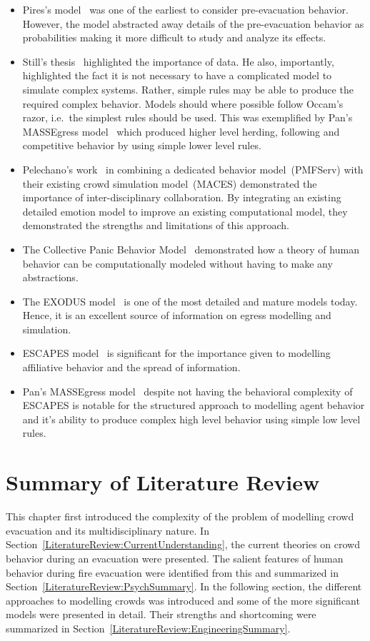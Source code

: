 \begin{itemize}
	\item Pires's model~\cite{Pires:2005gs} was one of the earliest to consider pre-evacuation behavior. However, the model abstracted away details of the pre-evacuation behavior as probabilities making it more difficult to study and analyze its effects.
	\item Still's thesis~\cite{Still:2000tp} highlighted the importance of data. He also, importantly, highlighted the fact it is not necessary to have a complicated model to simulate complex systems. Rather, simple rules may be able to produce the required complex behavior. Models should where possible follow Occam's razor, i.e.\ the simplest rules should be used. This was exemplified by Pan's MASSEgress model~\cite{Pan:2007gb} which produced higher level herding, following and competitive behavior by using simple lower level rules.
	\item Pelechano's work~\cite{Pelechano:2005vp} in combining a dedicated behavior model~(PMFServ) with their existing crowd simulation model~(MACES) demonstrated the importance of inter-disciplinary collaboration. By integrating an existing detailed emotion model to improve an existing computational model, they demonstrated the strengths and limitations of this approach.
	\item The Collective Panic Behavior Model~\cite{Franca:2009wq} demonstrated how a theory of human behavior can be computationally modeled without having to make any abstractions.
	\item The EXODUS model~\cite{Owen:1996jh} is one of the most detailed and mature models today. Hence, it is an excellent source of information on egress modelling and simulation.
    \item ESCAPES model~\cite{Tsai:2011tz} is significant for the importance given to modelling affiliative behavior and the spread of information.
	\item Pan's MASSEgress model~\cite{Pan:2006vp} despite not having the behavioral complexity of ESCAPES is notable for the structured approach to modelling agent behavior and it's ability to produce complex high level behavior using simple low level rules.
\end{itemize}

\section{Summary of Literature Review}
\label{LiteratureReview:Summary}
This chapter first introduced the complexity of the problem of modelling crowd evacuation and its multidisciplinary nature. In Section~\ref{LiteratureReview:CurrentUnderstanding}, the current theories on crowd behavior during an evacuation were presented. The salient features of human behavior during fire evacuation were identified from this and summarized in Section~\ref{LiteratureReview:PsychSummary}. In the following section, the different approaches to modelling crowds was introduced and some of the more significant models were presented in detail. Their strengths and shortcoming were summarized in Section~\ref{LiteratureReview:EngineeringSummary}.

